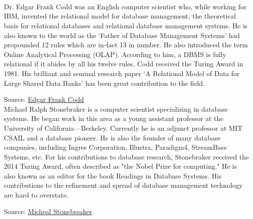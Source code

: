 \documentclass[12pt]{article}
\begin{document}
\maketitle


\section{}
\subsection{} \\
Dr. Edgar Frank Codd was an English computer scientist who, while working for IBM, invented the relational model for database management, the theoretical basis for relational databases and relational database management systems. He is also known to the world as the ‘Father of Database Management Systems’ had propounded 12 rules which are in-fact 13 in number. He also introduced the term Online Analytical Processing (OLAP). According to him, a DBMS is fully relational if it abides by all his twelve rules. Codd received the Turing Award in 1981. His brilliant and seminal research paper ‘A Relational Model of Data for Large Shared Data Banks’ has been great contribution to the field.

Source: \href{https://en.wikipedia.org/wiki/Edgar_F._Codd}{Edgar Frank Codd} \\

Michael Ralph Stonebraker is a computer scientist specializing in database systems. He began work in this area as a young assistant professor at the University of California—Berkeley. Currently he is an adjunct professor at MIT CSAIL and a database pioneer. He is also the founder of many database companies, including Ingres Corporation, Illustra, Paradigm4, StreamBase Systems, etc. For his contributions to database research, Stonebraker received the 2014 Turing Award, often described as "the Nobel Prize for computing." He is also known as an editor for the book Readings in Database Systems. His contributions to the refinement and spread of database management technology are hard to overstate. 

Source: \href{https://en.wikipedia.org/wiki/Michael_Stonebraker}{Micheal Stonebreaker} \\
\end{document}
